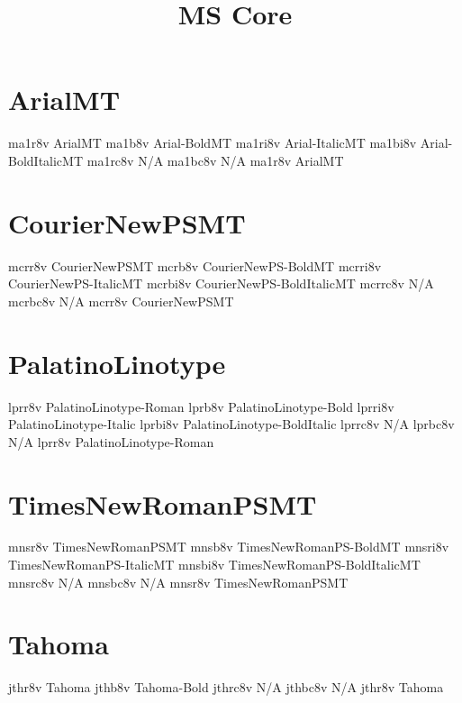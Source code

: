 \documentclass[sample]{vnsample}
\title{MS Core}
\begin{document}
\section{ArialMT}
  {ma1r8v}  {ArialMT}
  {ma1b8v}  {Arial-BoldMT}
 {ma1ri8v} {Arial-ItalicMT}
 {ma1bi8v} {Arial-BoldItalicMT}
 {ma1rc8v} {N/A}
 {ma1bc8v} {N/A}
  {ma1r8v}  {ArialMT}

\section{CourierNewPSMT}
  {mcrr8v}  {CourierNewPSMT}
  {mcrb8v}  {CourierNewPS-BoldMT}
 {mcrri8v} {CourierNewPS-ItalicMT}
 {mcrbi8v} {CourierNewPS-BoldItalicMT}
 {mcrrc8v} {N/A}
 {mcrbc8v} {N/A}
  {mcrr8v}  {CourierNewPSMT}

\section{PalatinoLinotype}
  {lprr8v}  {PalatinoLinotype-Roman}
  {lprb8v}  {PalatinoLinotype-Bold}
 {lprri8v} {PalatinoLinotype-Italic}
 {lprbi8v} {PalatinoLinotype-BoldItalic}
 {lprrc8v} {N/A}
 {lprbc8v} {N/A}
  {lprr8v}  {PalatinoLinotype-Roman}

\section{TimesNewRomanPSMT}
  {mnsr8v}  {TimesNewRomanPSMT}
  {mnsb8v}  {TimesNewRomanPS-BoldMT}
 {mnsri8v} {TimesNewRomanPS-ItalicMT}
 {mnsbi8v} {TimesNewRomanPS-BoldItalicMT}
 {mnsrc8v} {N/A}
 {mnsbc8v} {N/A}
  {mnsr8v}  {TimesNewRomanPSMT}

\section{Tahoma}
  {jthr8v}  {Tahoma}
  {jthb8v}  {Tahoma-Bold}
 {jthrc8v} {N/A}
 {jthbc8v} {N/A}
  {jthr8v}  {Tahoma}
\end{document}
